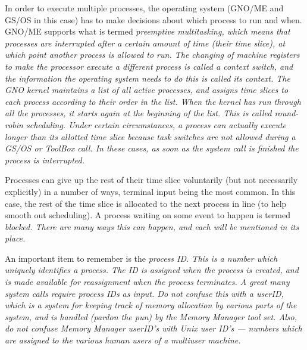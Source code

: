 \documentclass{report}
\begin{document}
In order to execute multiple processes, the
operating system (GNO/ME and GS/OS in this case) has to make
decisions about which process to run and when. GNO/ME supports
what is termed \it preemptive multitasking\rm, which means that
processes are interrupted after a certain amount of time (their
time slice), at which point another process is allowed to run.
The changing of machine registers to make the processor execute a
different process is called a 
\it context switch\rm, and the
information the operating system needs to do this is called its
\it context\rm.
The GNO kernel maintains a list of all active processes, and
assigns time slices to each process according to their order in
the list. When the kernel has run through all the processes, it
starts again at the beginning of the list. This is called \it round-robin
scheduling\rm. Under certain circumstances, a process can
actually execute longer than its allotted time slice because task
switches are not allowed during a GS/OS or ToolBox call. In these
cases, as soon as the system call is finished the process is
interrupted.

Processes can give up the rest of their
time slice voluntarily (but not necessarily explicitly) in a
number of ways, terminal input being the most common. In this
case, the rest of the time slice is allocated to the next process
in line (to help smooth out scheduling). A process waiting on
some event to happen is termed  \it blocked\rm.
There are many ways this can happen, and each will be mentioned in its place.

An important item to remember is the \it process
ID\rm. This is a number which uniquely identifies a process. The
ID is assigned when the process is created, and is made available
for reassignment when the process terminates. A great many system
calls require process IDs as input. Do not confuse this with a
userID, which is a system for keeping track of memory allocation
by various parts of the system, and is handled (pardon the pun)
by the Memory Manager tool set. Also, do not confuse Memory
Manager userID's with Unix user ID's --- numbers which are assigned
to the various human users of a multiuser machine.
\end{document}
